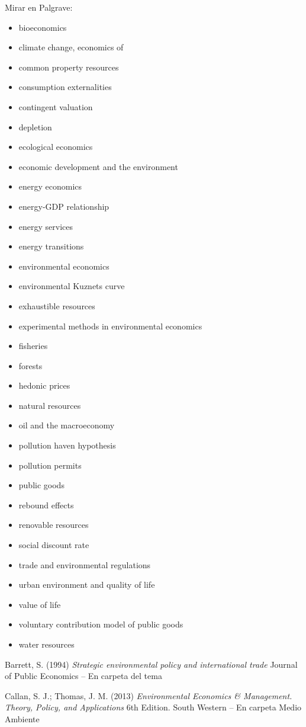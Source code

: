 \documentclass{nuevotema}
\begin{document}
Mirar en Palgrave:
\begin{itemize}
	\item bioeconomics
	\item climate change, economics of
	\item common property resources
	\item consumption externalities
	\item contingent valuation
	\item depletion
	\item ecological economics
	\item economic development and the environment
	\item energy economics
	\item energy-GDP relationship
	\item energy services
	\item energy transitions
	\item environmental economics
	\item environmental Kuznets curve
	\item exhaustible resources
	\item experimental methods in environmental economics
	\item fisheries
	\item forests
	\item hedonic prices
	\item natural resources
	\item oil and the macroeconomy
	\item pollution haven hypothesis
	\item pollution permits
	\item public goods
	\item rebound effects
	\item renovable resources
	\item social discount rate
	\item trade and environmental regulations
	\item urban environment and quality of life
	\item value of life
	\item voluntary contribution model of public goods
	\item water resources
\end{itemize}

Barrett, S. (1994) \textit{Strategic environmental policy and international trade} Journal of Public Economics -- En carpeta del tema

Callan, S. J.; Thomas, J. M. (2013) \textit{Environmental Economics \& Management. Theory, Policy, and Applications} 6th Edition. South Western -- En carpeta Medio Ambiente
\end{document}
